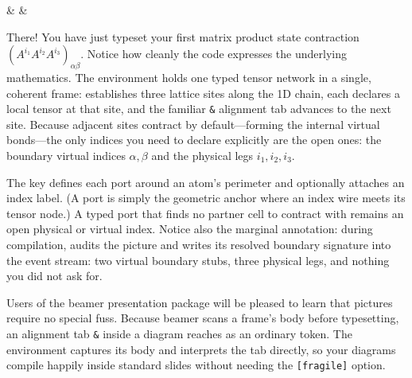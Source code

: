 \begin{tnexample}[
  label={tnex:tut-word},
  formula={(A^{i_1}A^{i_2}A^{i_3})_{\alpha\beta}},
  caption={three sites of a matrix product state},
  index={The horizontal bonds are summed virtual indices.  The two stubs
    are the open matrix indices $\alpha$ and $\beta$; each upward leg is
    one physical index.},
  signature={kernel-boundary|signature=open:e, open:w, phys:n, phys:n, phys:n}]
\begin{tenkz}[cols=3]
   &
   &
\end{tenkz}
\end{tnexample}

There!  You have just typeset your first matrix product state contraction
$(A^{i_1}A^{i_2}A^{i_3})_{\alpha\beta}$.  Notice how cleanly the code
expresses the underlying mathematics.  The  environment holds one
typed tensor network in a single, coherent frame:  establishes
three lattice sites along the 1D chain, each  declares a local tensor
at that site, and the familiar \verb|&| alignment tab advances to the next site.
Because adjacent sites contract by default---forming the internal virtual
bonds---the only indices you need to declare explicitly are the open ones: the
boundary virtual indices $\alpha,\beta$ and the physical legs $i_1,i_2,i_3$.

The  key defines each port around an atom's perimeter and
optionally attaches an index label.  (A port is simply the geometric anchor
where an index wire meets its tensor node.)  A typed port that finds no partner
cell to contract with remains an open physical or virtual index.  Notice also
the marginal annotation: during compilation, \pkg{} audits the picture and
writes its resolved boundary signature into the  event stream:
two virtual boundary stubs, three physical legs, and nothing you did not ask
for.

\dbendpar Users of the \textsf{beamer} presentation package will be pleased to
learn that \pkg{} pictures require no special fuss.  Because \textsf{beamer}
scans a frame's body before typesetting, an alignment tab \verb|&| inside a
diagram reaches \pkg{} as an ordinary token.  The environment captures its body
and interprets the tab directly, so your diagrams compile happily inside
standard slides without needing the \texttt{[fragile]} option.

